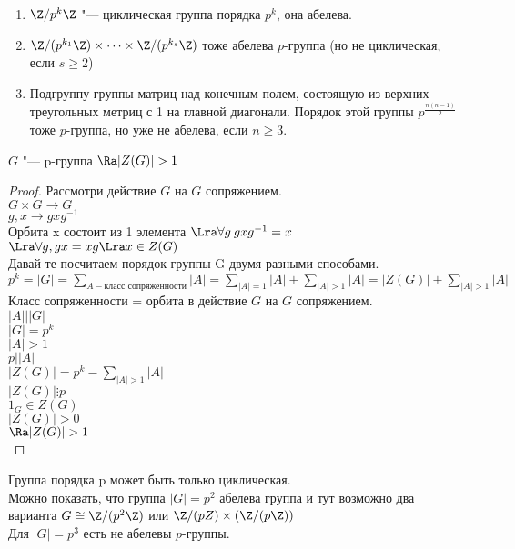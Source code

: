 \begin{exmp}\hfill
\begin{enumerate}
\item $\Z/{p^{k}\Z}$  "--- циклическая группа порядка $p^k$, она абелева.\\
\item $\Z/(p^{k_1}\Z) \times \cdots \times \Z/(p^{k_s}\Z)$ тоже абелева $p$-группа (но не циклическая, если $s \ge 2$)\\
\item Подгруппу группы матриц над конечным полем, состоящую из верхних треугольных метриц
с 1 на главной диагонали.  Порядок этой группы $p^\frac{n(n - 1)}{2}$ тоже $p$-группа, но уже не абелева,
если $n \ge 3$.
\end{enumerate}
\end{exmp}
\begin{theorem}
$G$ "--- p-группа $\Ra |Z(G)| > 1$\\
\end{theorem}
\begin{proof}
Рассмотри действие $G$ на $G$ сопряжением.\\
$G \times G \to G$\\
$g, x \to g x g^{-1}$\\

Орбита x состоит из 1 элемента $\Lra \forall g \: g x g^{-1} = x$\\
$\Lra \forall g, gx = xg \Lra x \in Z(G)$\\

Давай-те посчитаем порядок группы G двумя разными способами.\\
$p^{k} = |G| = \sum_{A - \text{класс сопряженности}}|A| = \sum_{|A| = 1}|A| + \sum_{|A| > 1}|A| = |Z(G)| + \sum_{|A| > 1}|A|$\\

Класс сопряженности = орбита в действие $G$ на $G$ сопряжением. \\
$|A| | |G|$  \\
$|G| = p^{k}$\\
$|A| > 1$ \\
$p | |A|$\\
$|Z(G)| = p^{k} - \sum_{|A| > 1}|A|$\\
$|Z(G)| \vdots p$\\
$1_{G} \in Z(G)$ \\
$|Z(G)| > 0$\\
$\Ra |Z(G)| > 1$\\
\end{proof}

Группа порядка p может быть только циклическая.\\ 
Можно показать, что группа $|G| = p^2$ абелева группа и тут возможно два варианта
$G \cong \Z/(p^2\Z)$ или $\Z/(pZ) \times (\Z/(p\Z))$ \\

Для $|G|= p^3$ есть не абелевы $p$-группы.
